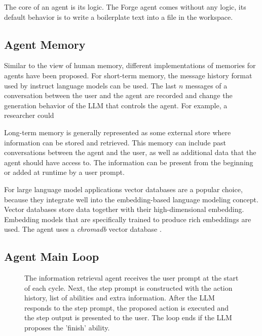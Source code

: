 \documentclass[../main.tex]{subfiles}
\begin{document}
The core of an agent is its logic.
The Forge agent comes without any logic, its default behavior is to write a boilerplate text into a file in the workspace.


\subsection{Agent Memory}

Similar to the view of human memory,
different implementations of memories for agents have been proposed.
For short-term memory,
the message history format used by instruct language models can be used.
The last $n$ messages of a conversation between the user and the agent
are recorded and change the generation behavior of the LLM that controls the agent.
For example, a researcher could

Long-term memory is generally represented as some external store
where information can be stored and retrieved.
This memory can include past conversations between the agent and the user,
as well as additional data that the agent should have access to.
The information can be present from the beginning or added at runtime by a user prompt.

For large language model applications vector databases are a popular choice,
because they integrate well into the embedding-based language modeling concept.
Vector databases store data together with their high-dimensional embedding.
Embedding models that are specifically trained to produce rich embeddings are used.
The agent uses a \emph{chromadb} vector database \autocite{zotero-176}.


\subsection{Agent Main Loop}

\begin{figure}[t]
      \centering
      \caption{The information retrieval agent receives the user prompt at the start of each cycle.
            Next, the step prompt is constructed with the action history, list of abilities and extra information.
            After the LLM responds to the step prompt, the proposed action is executed
            and the step output is presented to the user.
            The loop ends if the LLM proposes the 'finish' ability.}
      \label{fig:agent_loop}
\end{figure}
\end{document}
